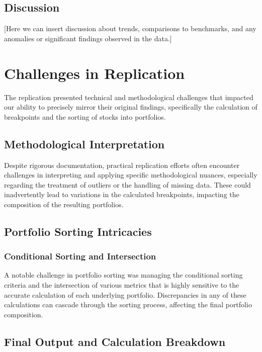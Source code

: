 \documentclass{article}
\begin{document}
\subsection*{Discussion}

[Here we can insert discussion about trends, comparisons to benchmarks, and any anomalies or significant findings observed in the data.]


\section*{Challenges in Replication}

The replication presented technical and methodological challenges that impacted our ability to precisely mirror their original findings, specifically the calculation of breakpoints and the sorting of stocks into portfolios.

\subsection*{Methodological Interpretation}

Despite rigorous documentation, practical replication efforts often encounter challenges in interpreting and applying specific methodological nuances, especially regarding the treatment of outliers or the handling of missing data. These could inadvertently lead to variations in the calculated breakpoints, impacting the composition of the resulting portfolios.

\subsection*{Portfolio Sorting Intricacies}

\subsubsection*{Conditional Sorting and Intersection}

A notable challenge in portfolio sorting was managing the conditional sorting criteria and the intersection of various metrics that is highly sensitive to the accurate calculation of each underlying portfolio. Discrepancies in any of these calculations can cascade through the sorting process, affecting the final portfolio composition.

\subsection*{Final Output and Calculation Breakdown}
\end{document}
